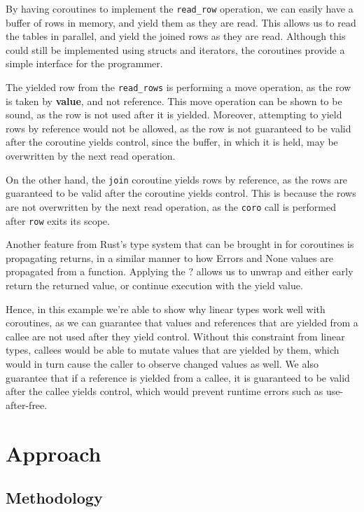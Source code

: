 \documentclass[review,twocolumn]{sigplanconf}
\begin{document}
By having coroutines to implement the \verb!read_row! operation, we can easily have a buffer of rows in memory, and yield them as they are read. This allows us to read the tables in parallel, and yield the joined rows as they are read. Although this could still be implemented using structs and iterators, the coroutines provide a simple interface for the programmer.

The yielded row from the \verb!read_rows! is performing a move operation, as the row is taken by \textbf{value}, and not reference. This move operation can be shown to be sound, as the row is not used after it is yielded. Moreover, attempting to yield rows by reference would not be allowed, as the row is not guaranteed to be valid after the coroutine yields control, since the buffer, in which it is held, may be overwritten by the next read operation.

On the other hand, the \verb!join! coroutine yields rows by reference, as the rows are guaranteed to be valid after the coroutine yields control. This is because the rows are not overwritten by the next read operation, as the \verb!coro! call is performed after \verb!row! exits its scope.

Another feature from Rust's type system that can be brought in for coroutines is propagating returns, in a similar manner to how Errors and None values are propagated from a function. Applying the $?$ allows us to unwrap and either early return the returned value, or continue execution with the yield value.

Hence, in this example we're able to show why linear types work well with coroutines, as we can guarantee that values and references that are yielded from a callee are not used after they yield control. Without this constraint from linear types, callees would be able to mutate values that are yielded by them, which would in turn cause the caller to observe changed values as well. We also guarantee that if a reference is yielded from a callee, it is guaranteed to be valid after the callee yields control, which would prevent runtime errors such as use-after-free.

\section{Approach}

\subsection{Methodology}
\end{document}
